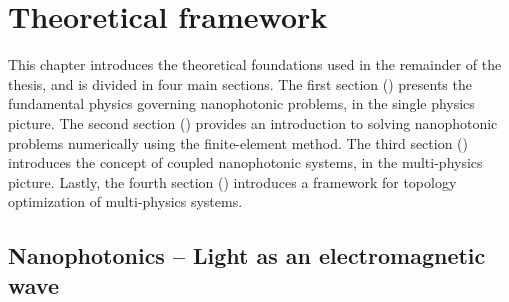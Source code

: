 \chapter{Theoretical framework}

This chapter introduces the theoretical foundations used in the remainder of
the thesis,
and is divided in four main sections. The first section
() presents the fundamental physics
governing nanophotonic problems, in the single physics picture. The second
section () provides
an introduction to solving nanophotonic problems numerically using the
finite-element method.
The third section () introduces the concept of coupled
nanophotonic systems, in the multi-physics
picture. Lastly, the fourth section () introduces a
framework for topology optimization of multi-physics systems.




\section{Nanophotonics -- Light as an electromagnetic
  wave}\label{sec:nanophotonics}

